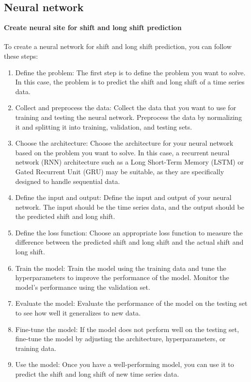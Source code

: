         \subsection{Neural network} \label{subsec:neural}
        \textbf{Create neural site for shift and long shift prediction}\\
        \\
        To create a neural network for shift and long shift prediction, you can follow these steps:
        \begin{enumerate}
            \item Define the problem: The first step is to define the problem you want to solve. In this case, the problem is to predict the
            shift and long shift of a time series data.
            \item Collect and preprocess the data: Collect the data that you want to use for training and testing the neural network.
            Preprocess the data by normalizing it and splitting it into training, validation, and testing sets.
            \item Choose the architecture: Choose the architecture for your neural network based on the problem you want to solve.
            In this case, a recurrent neural network (RNN) architecture such as a Long Short-Term Memory (LSTM) or Gated Recurrent Unit (GRU) may be
            suitable, as they are specifically designed to handle sequential data.
            \item Define the input and output: Define the input and output of your neural network. The input should be the time series data, and the
            output should be the predicted shift and long shift.
            \item Define the loss function: Choose an appropriate loss function to measure the difference between the predicted shift and long
            shift and the actual shift and long shift.
            \item Train the model: Train the model using the training data and tune the hyperparameters to improve the performance of the model.
            Monitor the model's performance using the validation set.
            \item Evaluate the model: Evaluate the performance of the model on the testing set to see how well it generalizes to new data.
            \item Fine-tune the model: If the model does not perform well on the testing set, fine-tune the model by adjusting the architecture,
            hyperparameters, or training data.
            \item Use the model: Once you have a well-performing model, you can use it to predict the shift and long shift of new time series data.
        \end{enumerate}
